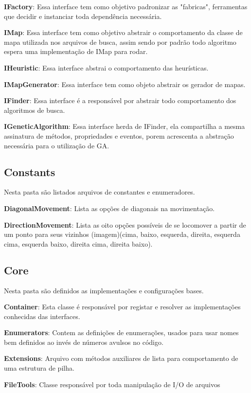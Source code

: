 \textbf{IFactory}: Essa interface tem como objetivo padronizar as "fabricas", ferramentas que decidir e instanciar toda dependência necessária.

\textbf{IMap}: Essa interface tem como objetivo abstrair o comportamento da classe de mapa utilizada nos arquivos de busca, assim sendo por padrão todo algoritmo espera uma implementação de IMap para rodar.

\textbf{IHeuristic}: Essa interface abstrai o comportamento das heurísticas.

\textbf{IMapGenerator}: Essa interface tem como objeto abstrair os gerador de mapas.

\textbf{IFinder}: Essa interface é a responsável por abstrair todo comportamento dos algoritmos de busca.

\textbf{IGeneticAlgorithm}: Essa interface herda de IFinder, ela compartilha a mesma assinatura de métodos, propriedades e eventos, porem acrescenta a abstração necessária para
o utilização de GA.

\subsection{Constants}

Nesta pasta são listados arquivos de constantes e enumeradores.

\textbf{DiagonalMovement}: Lista as opções de diagonais na movimentação.

\textbf{DirectionMovement}: Lista as oito opções possíveis de se locomover a partir de um ponto para seus vizinhos 
(imagem)(cima, baixo, esquerda, direita, esquerda cima, esquerda baixo, direita cima, direita baixo).

\subsection{Core}

Nesta pasta são definidos as implementações e configurações bases.

\textbf{Container}: Esta classe é responsável por registar e resolver as implementações conhecidas das interfaces.

\textbf{Enumerators}: Contem as definições de enumerações, usados para usar nomes bem definidos ao invés de números avulsos no código.

\textbf{Extensions}: Arquivo com métodos auxiliares de lista para comportamento de uma estrutura de pilha.

\textbf{FileTools}: Classe responsável por toda manipulação de I/O de arquivos

